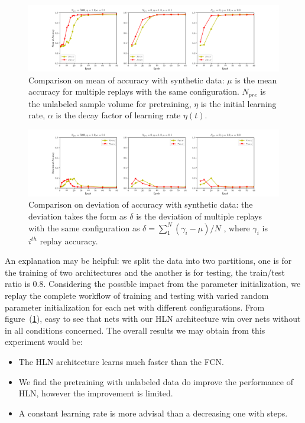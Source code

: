 \documentclass[3p,times,procedia]{elsarticle}
\begin{document}
\begin{figure}[h]
	\centerline{
		\includegraphics[width=7in]{mean_accuracy}}
	\caption{
		Comparison on mean of 
		accuracy with synthetic data:
		$\mu$ is the mean accuracy for
		multiple replays with the same
		configuration.
		$N_{pre}$ is the unlabeled sample 
		volume for pretraining, $\eta$
		is the initial learning rate,
		$\alpha$ is the decay factor of
		learning rate $\eta(t)$.
		}
	\label{fig:2}
\end{figure}

\begin{figure}[h]
	\centerline{
		\includegraphics[width=7in]{devi_accuracy}}
	\caption{
		Comparison on deviation of 
		accuracy with synthetic data:
		the deviation takes the form as
		$\delta$ is the deviation of
		multiple replays with the same
		configuration as 
		$\delta=\sum_1^N(\gamma_i-\mu)/N$
		, where $\gamma_i$ is $i^{th}$ 
		replay accuracy.
		}
	\label{fig:3}
\end{figure}


An explanation may be helpful:
we split the data into two partitions, 
one is for the training of two
architectures and the another is for
testing, the train/test ratio is 0.8.
Considering the possible impact from
the parameter initialization, 
we replay the complete workflow
of training and testing with varied
random parameter initialization
for each net with different 
configurations.
From figure~(\ref{fig:2}), easy
to see that nets with our HLN 
architecture win over nets without 
in all conditions concerned.
The overall results we may obtain
from this experiment would be:
\begin{itemize}
	\item The HLN architecture 
		learns much faster than the 
		FCN.
	\item We find the pretraining
		with unlabeled data do improve 
		the performance of HLN, however 
		the improvement is limited.
	\item A constant learning rate is
		more advisal than a decreasing 
		one with steps.
\end{itemize}
\end{document}

